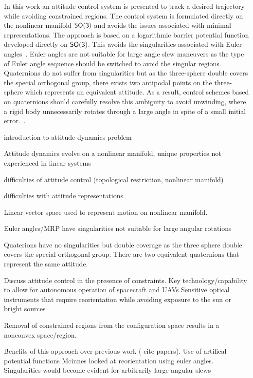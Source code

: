 \documentclass[letterpaper, 10 pt, conference]{ieeeconf}  %
\begin{document}
In this work an attitude control system is presented to track a desired trajectory while avoiding constrained regions. 
The control system is formulated directly on the nonlinear manifold \( \mathsf{SO(3)} \) and avoids the issues associated with minimal representations.
The approach is based on a logarithmic barrier potential function developed directly on \( \mathsf{SO(3)} \). 
This avoids the singularities associated with Euler angles~\cite{mcinnes1994}.
Euler angles are not suitable for large angle slew maneuvers as the type of Euler angle sequence should be switched to avoid the singular regions.
Quaternions do not suffer from singularities but as the three-sphere double covers the special orthogonal group, there exists two antipodal points on the three-sphere which represents an equivalent attitude.
As a result, control schemes based on quaternions should carefully resolve this ambiguity to avoid unwinding, where a rigid body unnecessarily rotates through a large angle in spite of a small initial error.~\cite{lee2011b}.

introduction to attitude dynamics problem

Attitude dynamics evolve on a nonlinear manifold, unique properties not experienced in linear systems

difficulties of attitude control (topological restriction, nonlinear manifold)

difficulties with attitude representations.

Linear vector space used to represent motion on nonlinear manifold. 

Euler angles/MRP have singularities not suitable for large angular rotations

Quaterions have no singularities but double coverage as the three sphere double covers the special orthogonal group.
There are two equivalent quaternions that represent the same attitude.

Discuss attitude control in the presence of constraints. 
Key technology/capability to allow for autonomous operation of spacecraft and UAVs
Sensitive optical instruments that require reorientation while avoiding exposure to the sun or bright sources

Removal of constrained regions from the configuration space results in a nonconvex space/region.

Benefits of this approach over previous work ( cite papers).
Use of artifical potential functions
Mcinnes looked at reorientation using euler angles. 
Singularities would become evident for arbitrarily large angular slews
\end{document}
